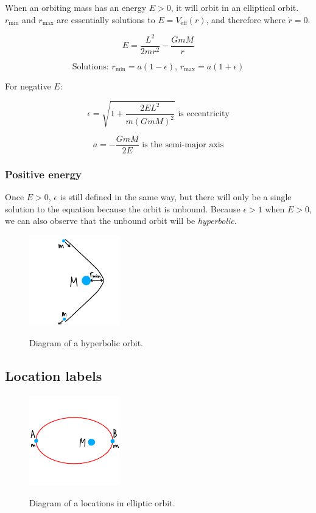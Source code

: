 \documentclass[12pt]{article}
\begin{document}
When an orbiting mass has an energy $E > 0$, it will orbit in an elliptical orbit.
$r_{\text{min}}$ and $r_{\text{max}}$ are essentially solutions to $E = V_{\text{eff}}(r)$, and therefore where $\dot{r} = 0$.

\[
E = \frac{L^2}{2mr^2} - \frac{GmM}{r}
\]

\[
\text{Solutions: } r_{\text{min}} = a(1 - \epsilon)\text{, } r_{\text{max}} = a(1 + \epsilon)
\]

For negative $E$:

\[
\epsilon = \sqrt{1 + \frac{2EL^2}{m(GmM)^2}}\text{ is eccentricity}
\]

\[
a = -\frac{GmM}{2E}\text{ is the semi-major axis}
\]

\newpage

\subsubsection{Positive energy}

Once $E>0$, $\epsilon$ is still defined in the same way, but there will only be a single solution to the equation because the orbit is unbound.
Because $\epsilon > 1$ when $E>0$, we can also observe that the unbound orbit will be \emph{hyperbolic}.

\begin{figure}[h]
    \centering
    \includegraphics[width=0.35\textwidth]{hyperbolic_orbit}
    \label{fig:hyperbolicorbit}
    \caption{Diagram of a hyperbolic orbit.}
\end{figure}

\subsection{Location labels}

\begin{figure}[h]
    \centering
    \includegraphics[width=0.35\textwidth]{location_labels}
    \label{fig:locationlabels}
    \caption{Diagram of a locations in elliptic orbit.}
\end{figure}
\end{document}
